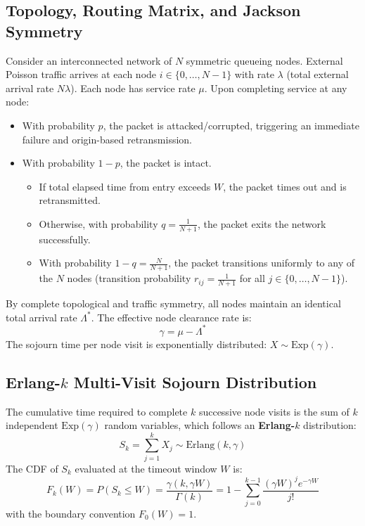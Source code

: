 \documentclass[12pt,onecolumn]{article}
\begin{document}
\subsection{Topology, Routing Matrix, and Jackson Symmetry}
Consider an interconnected network of $N$ symmetric queueing nodes. External Poisson traffic arrives at each node $i \in \{0, \dots, N-1\}$ with rate $\lambda$ (total external arrival rate $N\lambda$). Each node has service rate $\mu$. Upon completing service at any node:
\begin{itemize}
    \item With probability $p$, the packet is attacked/corrupted, triggering an immediate failure and origin-based retransmission.
    \item With probability $1 - p$, the packet is intact.
    \begin{itemize}
        \item If total elapsed time from entry exceeds $W$, the packet times out and is retransmitted.
        \item Otherwise, with probability $q = \frac{1}{N+1}$, the packet exits the network successfully.
        \item With probability $1 - q = \frac{N}{N+1}$, the packet transitions uniformly to any of the $N$ nodes (transition probability $r_{ij} = \frac{1}{N+1}$ for all $j \in \{0, \dots, N-1\}$).
    \end{itemize}
\end{itemize}
By complete topological and traffic symmetry, all nodes maintain an identical total arrival rate $\Lambda^*$. The effective node clearance rate is:
\begin{equation}
\gamma = \mu - \Lambda^*
\end{equation}
The sojourn time per node visit is exponentially distributed: $X \sim \text{Exp}(\gamma)$.

\subsection{Erlang-\texorpdfstring{$k$}{k} Multi-Visit Sojourn Distribution}
The cumulative time required to complete $k$ successive node visits is the sum of $k$ independent $\text{Exp}(\gamma)$ random variables, which follows an \textbf{Erlang-$k$} distribution:
\begin{equation}
S_k = \sum_{j=1}^k X_j \sim \text{Erlang}(k, \gamma)
\end{equation}
The CDF of $S_k$ evaluated at the timeout window $W$ is:
\begin{equation}
F_k(W) = P(S_k \le W) = \frac{\gamma(k, \gamma W)}{\Gamma(k)} = 1 - \sum_{j=0}^{k-1} \frac{(\gamma W)^j e^{-\gamma W}}{j!}
\end{equation}
with the boundary convention $F_0(W) = 1$.
\end{document}
